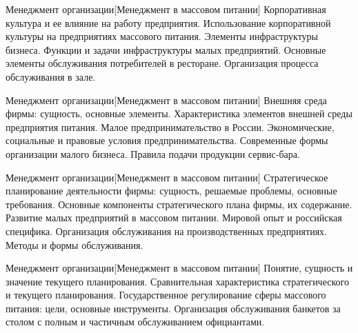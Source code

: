 \documentclass[
	11pt,
	a4paper,
	]
	{article}
\begin{document}
\vfill



\begin{minipage}[t][\miniH]{\miniL}\centering
	 {Менеджмент организации}[Менеджмент в массовом питании]
		{
			Корпоративная культура и ее влияние на работу предприятия. Использование корпоративной культуры на предприятиях массового питания.
		}{
			Элементы инфраструктуры бизнеса. Функции и задачи инфраструктуры малых предприятий.
		}{
			Основные элементы обслуживания потребителей в ресторане. Организация процесса обслуживания в зале.
		}
	\lowGE
\end{minipage}

\vfill



\begin{minipage}[t][\miniH]{\miniL}\centering
	 {Менеджмент организации}[Менеджмент в массовом питании]
		{
			Внешняя среда фирмы: сущность, основные элементы. Характеристика элементов внешней среды предприятия питания.
		}{
			Малое предпринимательство в России. Экономические, социальные и правовые условия предпринимательства. Современные формы организации малого бизнеса.
		}{
			Правила подачи продукции сервис-бара.
		}
	\lowGE
\end{minipage}





\begin{minipage}[t][\miniH]{\miniL}\centering
	 {Менеджмент организации}[Менеджмент в массовом питании]
		{
			Стратегическое планирование деятельности фирмы: сущность, решаемые проблемы, основные требования. Основные компоненты стратегического плана фирмы, их содержание.
		}{
			Развитие малых предприятий в массовом питании. Мировой опыт и российская специфика.
		}{
			Организация обслуживания на производственных предприятиях. Методы и формы обслуживания.
		}
	\lowGE
\end{minipage}

\vfill



\begin{minipage}[t][\miniH]{\miniL}\centering
	 {Менеджмент организации}[Менеджмент в массовом питании]
		{
			Понятие, сущность и значение текущего планирования. Сравнительная характеристика стратегического и текущего планирования.
		}{
			Государственное регулирование сферы массового питания: цели, основные инструменты.
		}{
			Организация обслуживания банкетов за столом с полным и частичным обслуживанием официантами.
		}
	\lowGE
\end{minipage}
\end{document}
